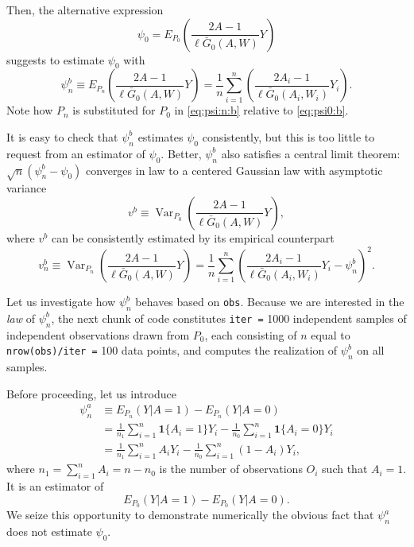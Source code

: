 \documentclass[]{article}
\DeclareMathOperator{\Var}{Var}
\newcommand{\Gbar}{\bar{G}}
\newcommand{\one}{\textbf{1}}
\theoremstyle{definition}
\theoremstyle{definition}
\theoremstyle{definition}
\theoremstyle{remark}
\begin{document}
Then, the alternative expression
\begin{equation}\label{eq:psi0:b} \psi_{0} =
E_{P_{0}}     \left(\frac{2A-1}{\ell\Gbar_{0}(A,W)}Y\right)     \end{equation}
suggests to estimate \(\psi_{0}\) with
\begin{equation}\label{eq:psi:n:b}\psi_{n}^{b}         \equiv        E_{P_{n}}
\left(\frac{2A-1}{\ell\Gbar_{0}(A,W)}Y\right)  =   \frac{1}{n}  \sum_{i=1}^{n}
\left(\frac{2A_{i}-1}{\ell\Gbar_{0}(A_{i},W_{i})}Y_{i}\right).\end{equation}
Note how \(P_{n}\) is substituted for \(P_{0}\) in \eqref{eq:psi:n:b}
relative to \eqref{eq:psi0:b}.

It is easy to check that \(\psi_{n}^{b}\) estimates \(\psi_{0}\)
consistently, but this is too little to request from an estimator of
\(\psi_{0}\). Better, \(\psi_{n}^{b}\) also satisfies a central limit
theorem: \(\sqrt{n} (\psi_{n}^{b} - \psi_{0})\) converges in law to a
centered Gaussian law with asymptotic variance
\begin{equation*}v^{b}     \equiv     \Var_{P_{0}}
\left(\frac{2A-1}{\ell\Gbar_{0}(A,W)}Y\right),\end{equation*} where
\(v^{b}\) can be consistently estimated by its empirical counterpart
\begin{equation}\label{eq:v:n:b}      v_{n}^{b}       \equiv      \Var_{P_{n}}
\left(\frac{2A-1}{\ell\Gbar_{0}(A,W)}Y\right)  =   \frac{1}{n}  \sum_{i=1}^{n}
\left(\frac{2A_{i}-1}{\ell\Gbar_{0}(A_{i},W_{i})}Y_{i}                       -
\psi_{n}^{b}\right)^{2}.\end{equation}

Let us investigate how \(\psi_{n}^{b}\) behaves based on \texttt{obs}.
Because we are interested in the \textit{law} of \(\psi_{n}^{b}\), the
next chunk of code constitutes \texttt{iter\ =} 1000 independent samples
of independent observations drawn from \(P_{0}\), each consisting of
\(n\) equal to \texttt{nrow(obs)/iter\ =} 100 data points, and computes
the realization of \(\psi_{n}^{b}\) on all samples.

Before proceeding, let us introduce \begin{align*}\psi_{n}^{a}  &\equiv
E_{P_{n}}  \left(Y  |  A=1\right)  -  E_{P_{n}} \left(Y  |  A=0\right)  \\  &=
\frac{1}{n_{1}}   \sum_{i=1}^{n}  \one\{A_{i}=1\}   Y_{i}  -   \frac{1}{n_{0}}
\sum_{i=1}^{n} \one\{A_{i}=0\} Y_{i}  \\&=\frac{1}{n_{1}} \sum_{i=1}^{n} A_{i}
Y_{i} - \frac{1}{n_{0}}  \sum_{i=1}^{n} (1 - A_{i})  Y_{i}, \end{align*}
where \(n_{1} = \sum_{i=1}^{n} A_{i} = n - n_{0}\) is the number of
observations \(O_{i}\) such that \(A_{i} = 1\). It is an estimator of
\begin{equation*}E_{P_{0}} (Y | A=1) -  E_{P_{0}} (Y | A=0).\end{equation*}
We seize this opportunity to demonstrate numerically the obvious fact
that \(\psi_{n}^{a}\) does not estimate \(\psi_{0}\).
\end{document}

